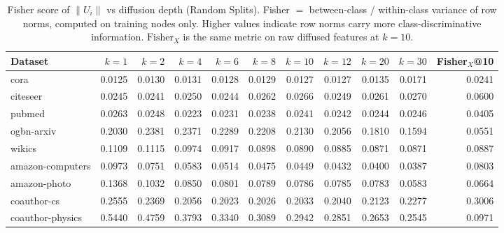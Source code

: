 \begin{table}[t]
\centering\small\setlength{\tabcolsep}{5pt}
\caption{Fisher score of $\|U_i\|$ vs diffusion depth (Random Splits). Fisher $=$ between-class / within-class variance of row norms, computed on training nodes only. Higher values indicate row norms carry more class-discriminative information. $\text{Fisher}_X$ is the same metric on raw diffused features at $k=10$.}
\label{tab:fisher_vs_k_random}
\begin{tabular}{lrrrrrrrrrr}
\toprule
Dataset & $k=1$ & $k=2$ & $k=4$ & $k=6$ & $k=8$ & $k=10$ & $k=12$ & $k=20$ & $k=30$ & Fisher$_X$@10 \\
\midrule
cora & 0.0125 & 0.0130 & 0.0131 & 0.0128 & 0.0129 & 0.0127 & 0.0127 & 0.0135 & 0.0171 & 0.0241 \\
citeseer & 0.0245 & 0.0241 & 0.0250 & 0.0244 & 0.0262 & 0.0266 & 0.0249 & 0.0261 & 0.0270 & 0.0600 \\
pubmed & 0.0263 & 0.0248 & 0.0223 & 0.0231 & 0.0238 & 0.0241 & 0.0242 & 0.0244 & 0.0246 & 0.0405 \\
ogbn\mbox{-}arxiv & 0.2030 & 0.2381 & 0.2371 & 0.2289 & 0.2208 & 0.2130 & 0.2056 & 0.1810 & 0.1594 & 0.0551 \\
wikics & 0.1109 & 0.1115 & 0.0974 & 0.0917 & 0.0898 & 0.0890 & 0.0885 & 0.0871 & 0.0871 & 0.0887 \\
amazon\mbox{-}computers & 0.0973 & 0.0751 & 0.0583 & 0.0514 & 0.0475 & 0.0449 & 0.0432 & 0.0400 & 0.0387 & 0.0803 \\
amazon\mbox{-}photo & 0.1368 & 0.1032 & 0.0850 & 0.0801 & 0.0789 & 0.0786 & 0.0785 & 0.0783 & 0.0583 & 0.0664 \\
coauthor\mbox{-}cs & 0.2555 & 0.2369 & 0.2056 & 0.2023 & 0.2026 & 0.2033 & 0.2040 & 0.2123 & 0.2277 & 0.3006 \\
coauthor\mbox{-}physics & 0.5440 & 0.4759 & 0.3793 & 0.3340 & 0.3089 & 0.2942 & 0.2851 & 0.2653 & 0.2545 & 0.0971 \\
\bottomrule\end{tabular}\end{table}